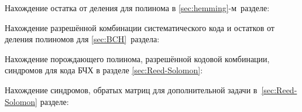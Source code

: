 \newpage
{} 
\label{sec:octave}

Нахождение остатка от деления для полинома в
\ref{sec:hemming}-м~разделе:  
\label{page1}


Нахождение разрешённой комбинации систематического кода и остатков от
деления полиномов для \ref{sec:BCH}~раздела:
\label{page2}
 

Нахождение порождающего полинома, разрешённой кодовой комбинации,
синдромов для кода БЧХ в разделе \ref{sec:Reed-Solomon}:
\label{page3}


Нахождение синдромов, обратых матриц для дополнительной задачи
в~\ref{sec:Reed-Solomon} разделе:
\label{page4}

 \newpage



